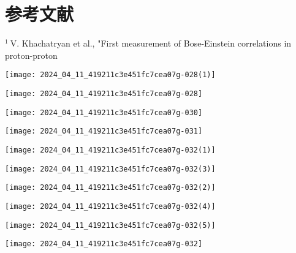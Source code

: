 \section*{参考文献}
${ }^{1} \mathrm{~V}$. Khachatryan et al., "First measurement of Bose-Einstein correlations in proton-proton

\begin{center}
\texttt{[image: 2024\_04\_11\_419211c3e451fc7cea07g-028(1)]}
\end{center}
\begin{center}
\texttt{[image: 2024\_04\_11\_419211c3e451fc7cea07g-028]}
\end{center}
\begin{center}
\texttt{[image: 2024\_04\_11\_419211c3e451fc7cea07g-030]}
\end{center}
\begin{center}
\texttt{[image: 2024\_04\_11\_419211c3e451fc7cea07g-031]}
\end{center}
\begin{center}
\texttt{[image: 2024\_04\_11\_419211c3e451fc7cea07g-032(1)]}
\end{center}
\begin{center}
\texttt{[image: 2024\_04\_11\_419211c3e451fc7cea07g-032(3)]}
\end{center}
\begin{center}
\texttt{[image: 2024\_04\_11\_419211c3e451fc7cea07g-032(2)]}
\end{center}
\begin{center}
\texttt{[image: 2024\_04\_11\_419211c3e451fc7cea07g-032(4)]}
\end{center}
\begin{center}
\texttt{[image: 2024\_04\_11\_419211c3e451fc7cea07g-032(5)]}
\end{center}
\begin{center}
\texttt{[image: 2024\_04\_11\_419211c3e451fc7cea07g-032]}
\end{center}
